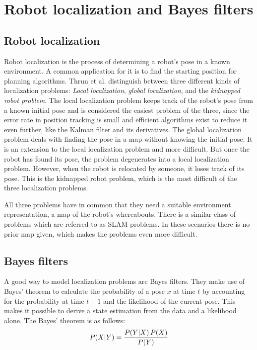 \documentclass[Thesis.tex]{subfiles}
\begin{document}
\chapter{Robot localization and Bayes filters}

\section{Robot localization}

Robot localization is the process of determining a robot's pose in a known environment. A common application for it is to find the starting position for planning algorithms. Thrun et al. distinguish between three different kinds of localization problems: \emph{Local localization}, \emph{global localization}, and the \emph{kidnapped robot problem}\cite{ThrunBurgardFox:2005}. The local localization problem keeps track of the robot's pose from a known initial pose and is considered the easiest problem of the three, since the error rate in position tracking is small and efficient algorithms exist to reduce it even further, like the Kalman filter and its derivatives\cite{ThrunBurgardFox:2005}. The global localization problem deals with finding the pose in a map without knowing the initial pose. It is an extension to the local localization problem and more difficult. But once the robot has found its pose, the problem degenerates into a local localization problem. However, when the robot is relocated by someone, it loses track of its pose. This is the kidnapped robot problem, which is the most difficult of the three localization problems.

All three problems have in common that they need a suitable environment representation, a map of the robot's whereabouts. There is a similar class of problems which are referred to as \gls{SLAM} problems. In these scenarios there is no prior map given, which makes the problems even more difficult. 


\section{Bayes filters}
A good way to model localization problems are Bayes filters. They make use of Bayes' theorem to calculate the probability of a pose $x$ at time $t$ by accounting for the probability at time $t-1$ and the likelihood of the current pose. This makes it possible to derive a state estimation from the data and a likelihood alone. The Bayes' theorem is as follows:
%
\begin{align}
\p[P]{X}{Y} = \frac{ \p[P]{Y}{X} P(X) } { P(Y) }
\end{align}
\end{document}
